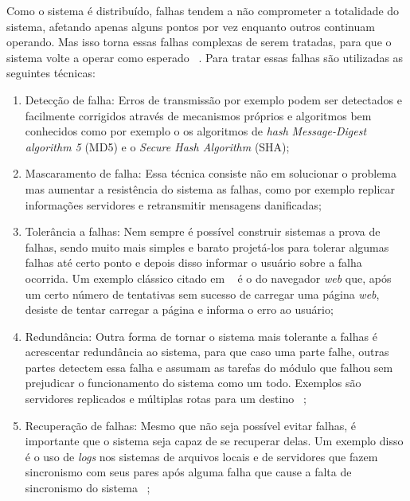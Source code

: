         Como o sistema é distribuído, falhas tendem a não comprometer a totalidade do sistema, afetando apenas alguns pontos  por vez enquanto outros continuam operando. Mas isso torna essas falhas complexas de serem tratadas, para que o sistema volte a operar como esperado ~\cite{coulouris}. Para tratar essas falhas são utilizadas as seguintes técnicas:
        \begin{enumerate}
    
            \item Detecção de falha: Erros de transmissão por exemplo podem ser detectados e facilmente corrigidos através de mecanismos próprios e algoritmos bem conhecidos como por exemplo o os algoritmos de \textit{hash} \textit{Message-Digest algorithm 5} (MD5) e o \textit{Secure Hash Algorithm} (SHA);
            
            \item Mascaramento de falha: Essa técnica consiste não em solucionar o problema mas aumentar a resistência do sistema as falhas, como por exemplo replicar informações servidores e retransmitir mensagens danificadas;
            
            \item Tolerância a falhas: Nem sempre é possível construir sistemas a prova de falhas, sendo muito mais simples e barato projetá-los para tolerar algumas falhas até certo ponto e depois disso informar o usuário sobre a falha ocorrida. Um exemplo clássico citado em ~\cite{coulouris} é o do navegador \textit{web} que, após um certo número de tentativas sem sucesso de carregar uma página \textit{web}, desiste de tentar carregar a página e informa o erro ao usuário;
            
            \item Redundância: Outra forma de tornar o sistema mais tolerante a falhas é acrescentar redundância ao sistema, para que caso uma parte falhe, outras partes detectem essa falha e assumam as tarefas do módulo que falhou sem prejudicar o funcionamento do sistema como um todo. Exemplos são servidores replicados e múltiplas rotas para um destino ~\cite{coulouris};
            
            \item Recuperação de falhas: Mesmo que não seja possível evitar falhas, é importante que o sistema seja capaz de se recuperar delas. Um exemplo disso é o uso de \textit{logs} nos sistemas de arquivos locais e de servidores que fazem sincronismo com seus pares após alguma falha que cause a falta de sincronismo do sistema ~\cite{coulouris};
            
        \end{enumerate}
    
